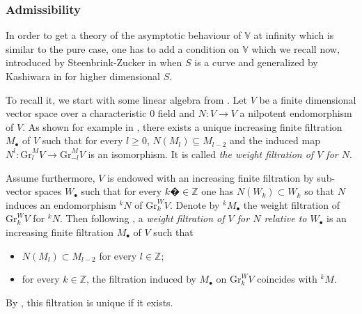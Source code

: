 \documentclass[10pt]{article}
\numberwithin{equation}{subsection}
\theoremstyle{plain}
\theoremstyle{definition}
\theoremstyle{remark}
\newcommand{\Z}{\mathbb Z}
\newcommand{\V}{\mathbb V}
\newcommand{\bul}{\bullet}
\newcommand{\Gr}{\mathrm{Gr}}
\begin{document}
\subsubsection*{Admissibility}
In order to get a theory of the asymptotic behaviour of $\V$ at infinity which is similar to the pure case, one has to add a condition on $\V$ which we recall now, introduced by Steenbrink-Zucker in \cite{sz} when $S$ is a curve and generalized by Kashiwara in \cite{kashiwara} for higher dimensional $S$.

To recall it, we start with some linear algebra from \cite[�2]{sz}. Let $V$ be a finite dimensional vector space over a characteristic $0$ field and $N : V \rightarrow V$ a nilpotent endomorphism of $V$. As shown for example in \cite[Lem. 6.4]{schmid}, there exists a unique increasing finite filtration $M_\bul$ of $V$ such that for every $l \geqslant 0$, $N(M_l) \subseteq M_{l-2}$ and the induced map $N^l : \Gr^{M}_{l}V  \rightarrow \Gr^{M}_{-l}V$ is an isomorphism. It is called \textit{the weight filtration of $V$ for $N$}.

Assume furthermore, $V$ is endowed with an increasing finite filtration by sub-vector spaces $W_\bul$ such that for every $k�\in \Z$ one has $N(W_k) \subset W_k$ so that $N$ induces an endomorphism ${^k}N$ of $\Gr^{W}_kV$. Denote by ${^k}M_\bul$ the weight filtration of $\Gr^{W}_kV$ for ${^k}N$. Then following \cite[Def. 2.5]{sz}, a \textit{weight filtration of $V$ for $N$ relative to $W_\bul$} is an increasing finite filtration $M_\bul$ of $V$ such that
\begin{itemize}
\item $N(M_l )\subset M_{l-2}$ for every $l \in \Z$;
\item for every $k \in \Z$, the filtration induced by $M_\bul$ on $\Gr^W_kV$ coincides with ${^k}M$.
\end{itemize}
By \cite[Prop. 2.6]{sz}, this filtration is unique if it exists.
\end{document}
